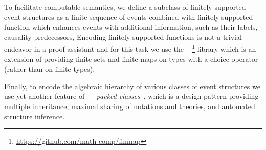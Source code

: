 To facilitate computable semantics, we define a subclass of
finitely supported event structures as a finite sequence of events
combined with finitely supported function which enhances events with 
additional information, such as their labels, causality predecessors, \etc 
Encoding finitely supported functions is not a trivial endeavor in
a proof assistant and for this task we use the \finmap~%
\footnote{\url{https://github.com/math-comp/finmap}}
library which is an extension of \mathcomp providing finite sets and
finite maps on types with a choice operator (rather than on finite types).

Finally, to encode the algebraic hierarchy of various classes of event structures
we use yet another feature of \mathcomp --- 
\emph{packed classes}~\cite{Garillot-al:ICTPHOL2009},
which is a design pattern providing multiple inheritance,
maximal sharing of notations and theories,
and automated structure inference. %

